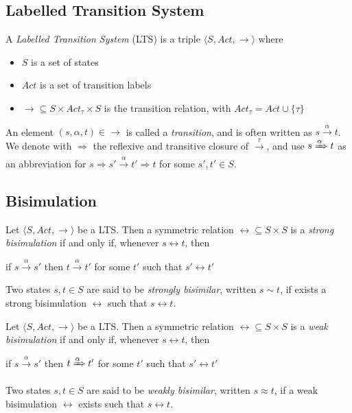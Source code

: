 \subsection{Labelled Transition System}

A \textit{Labelled Transition System} (LTS) is a triple $\langle S , Act, \rightarrow \rangle$ where \begin{itemize}
\item $S$ is a set of states
\item $Act$ is a set of transition labels
\item $\rightarrow 	\subseteq S\times Act_\tau \times S$ is the transition relation, with $Act_\tau = Act \cup \{\tau\}$
\end{itemize} 

An element $(s, \alpha, t) \in \rightarrow$ is called a \textit{transition}, and is often written as $s \xrightarrow{\alpha} t$. We denote with $\Rightarrow$ the reflexive and transitive closure of $\xrightarrow{\tau}$, and use $s \xRightarrow{\alpha} t$ as an abbreviation for $s \Rightarrow s' \xrightarrow{\alpha} t' \Rightarrow t$ for some $s', t' \in S$.

\subsection{Bisimulation}

Let $\langle S , Act, \rightarrow \rangle$ be a LTS. Then a symmetric relation $\rel \subseteq S \times S$ is a \textit{strong bisimulation} if and only if, whenever $s \rel t$, then 
\begin{center}
if $s \xrightarrow{\alpha} s'$ then $t \xrightarrow{\alpha} t'$ for some $t'$ such that $s' \rel t'$
\end{center}
Two states $s, t \in S$ are said to be \textit{strongly bisimilar}, written $s \sim t$, if exists a strong bisimulation $\rel$ such that $s \rel t$.


Let $\langle S , Act, \rightarrow \rangle$ be a LTS. Then a symmetric relation $\rel \subseteq S \times S$ is a \textit{weak bisimulation} if and only if, whenever $s \rel t$, then 
\begin{center}
if $s \xrightarrow{\alpha} s'$ then $t \xRightarrow{\alpha} t'$ for some $t'$ such that $s' \rel t'$
\end{center}
Two states $s, t \in S$ are said to be \textit{weakly bisimilar}, written $s \approx t$, if a weak bisimulation $\rel$ exists such that $s \rel t$. 



